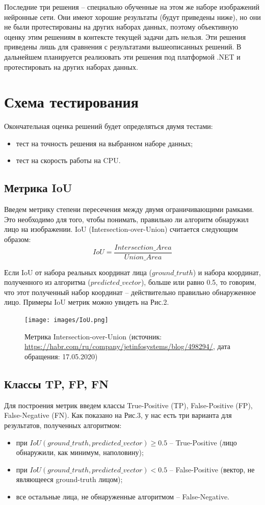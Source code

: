 \documentclass[14pt]{matmex-diploma-custom}
\begin{document}
    Последние три решения -- специально обученные на этом же наборе изображений нейронные сети. Они имеют хорошие результаты (будут приведены ниже), но они не были протестированы на других наборах данных, поэтому объективную оценку этим решениям в контексте текущей задачи дать нельзя. Эти решения приведены лишь для сравнения с результатами вышеописанных решений. В дальнейшем планируется реализовать эти решения под платформой .NET и протестировать на других наборах данных.


\section{Схема тестирования}

Окончательная оценка решений будет определяться двумя тестами:
\begin{itemize}
    \item тест на точность решения на выбранном наборе данных;
    \item тест на скорость работы на CPU.
\end{itemize}
 
 \subsection{Метрика IoU}
    Введем метрику степени пересечения между двумя ограничивающими рамками. Это необходимо для того, чтобы понимать, правильно ли алгоритм обнаружил лицо на изображении. IoU (Intersection-over-Union) считается следующим образом:
    $$IoU = \frac{Intersection\_Area}{Union\_Area}$$ \par
    Если IoU от набора реальных координат лица ($ground\_truth$) и набора координат, полученного из алгоритма ($predicted\_vector$), больше или равно 0.5, то говорим, что этот полученный набор координат -- действительно правильно обнаруженное лицо. Примеры IoU метрик можно увидеть на Рис.2. 
    
  \begin{figure}[h]
            \centering
            \texttt{[image: images/IoU.png]}
            \caption{Метрика Intersection-over-Union (источник: \url{https://habr.com/ru/company/jetinfosystems/blog/498294/}, дата обращения: 17.05.2020)}
    \end{figure}
 
 
 \subsection{Классы TP, FP, FN}
    Для построения метрик введем классы True-Positive (TP), False-Positive (FP), False-Negative (FN). Как показано на Рис.3, у нас есть три варианта для результатов, полученных алгоритмом: 
    \begin{itemize}
        \item при $IoU(ground\_truth, predicted\_vector) \geq 0.5$ -- True-Positive (лицо обнаружили, как минимум, наполовину);
        \item при $IoU(ground\_truth, predicted\_vector) < 0.5$ -- False-Positive (вектор, не являющееся ground-truth лицом);
        \item все остальные лица, не обнаруженные алгоритмом -- False-Negative.
    \end{itemize}
 
\end{document}
